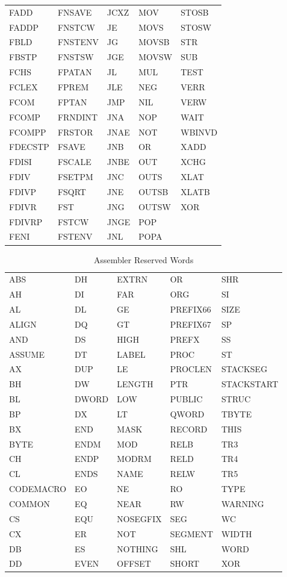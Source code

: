 \begin{table}
\begin{tabular}{p{2.5cm} p{2.5cm} p{2.5cm} p{2.5cm} p{2.5cm}}
FADD & FNSAVE & JCXZ & MOV & STOSB\\
FADDP & FNSTCW & JE & MOVS & STOSW\\
FBLD & FNSTENV & JG & MOVSB & STR\\
FBSTP & FNSTSW & JGE & MOVSW & SUB\\
FCHS & FPATAN & JL & MUL & TEST\\
FCLEX & FPREM & JLE & NEG & VERR\\
FCOM & FPTAN & JMP & NIL & VERW\\
FCOMP & FRNDINT & JNA & NOP & WAIT\\
FCOMPP & FRSTOR & JNAE & NOT & WBINVD\\
FDECSTP & FSAVE & JNB & OR & XADD\\
FDISI & FSCALE & JNBE & OUT & XCHG\\
FDIV & FSETPM & JNC & OUTS & XLAT\\
FDIVP & FSQRT & JNE & OUTSB & XLATB\\
FDIVR & FST & JNG & OUTSW & XOR\\
FDIVRP & FSTCW & JNGE & POP\\
FENI & FSTENV & JNL & POPA\\
\end{tabular}
\end{table}

\begin{table}
\caption{Assembler Reserved Words}

\begin{tabular}{p{2.5cm} p{2.5cm} p{2.5cm} p{2.5cm} p{2.5cm}}
\\
ABS & DH & EXTRN & OR & SHR\\
AH & DI & FAR & ORG & SI\\
AL & DL & GE & PREFIX66 & SIZE\\
ALIGN & DQ & GT & PREFIX67 & SP\\
AND & DS & HIGH & PREFX & SS\\
ASSUME & DT & LABEL & PROC & ST\\
AX & DUP & LE & PROCLEN & STACKSEG\\
BH & DW & LENGTH & PTR & STACKSTART\\
BL & DWORD & LOW & PUBLIC & STRUC\\
BP & DX & LT & QWORD & TBYTE\\
BX & END & MASK & RECORD & THIS\\
BYTE & ENDM & MOD & RELB & TR3\\
CH & ENDP & MODRM & RELD & TR4\\
CL & ENDS & NAME & RELW & TR5\\
CODEMACRO & EO & NE & RO & TYPE\\
COMMON & EQ & NEAR & RW & WARNING\\
CS & EQU & NOSEGFIX & SEG & WC\\
CX & ER & NOT & SEGMENT & WIDTH\\
DB & ES & NOTHING & SHL & WORD\\
DD & EVEN & OFFSET & SHORT & XOR\\
\end{tabular}
\end{table}
